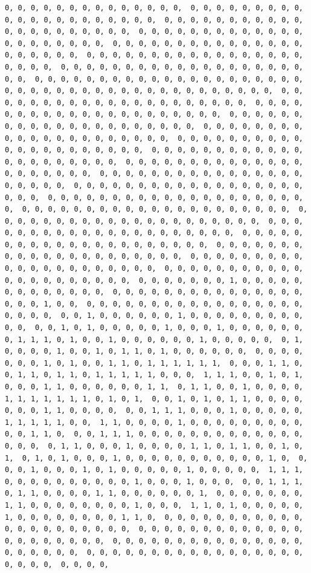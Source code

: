 \documentclass[
]{article}
\begin{document}
\begin{verbatim}
0, 0, 0, 0, 0, 0, 0, 0, 0, 0, 0, 0, 0, 0,  0, 0, 0, 0, 0, 0, 0, 0, 0, 0, 0, 0, 0, 0, 0, 0, 0, 0, 0, 0, 0,  0, 0, 0, 0, 0, 0, 0, 0, 0, 0, 0, 0, 0, 0, 0, 0, 0, 0, 0, 0, 0,  0, 0, 0, 0, 0, 0, 0, 0, 0, 0, 0, 0, 0, 0, 0, 0, 0, 0, 0, 0, 0,  0, 0, 0, 0, 0, 0, 0, 0, 0, 0, 0, 0, 0, 0, 0, 0, 0, 0, 0, 0, 0,  0, 0, 0, 0, 0, 0, 0, 0, 0, 0, 0, 0, 0, 0, 0, 0, 0, 0, 0, 0, 0,  0, 0, 0, 0, 0, 0, 0, 0, 0, 0, 0, 0, 0, 0, 0, 0, 0, 0, 0, 0, 0,  0, 0, 0, 0, 0, 0, 0, 0, 0, 0, 0, 0, 0, 0, 0, 0, 0, 0, 0, 0, 0,  0, 0, 0, 0, 0, 0, 0, 0, 0, 0, 0, 0, 0, 0, 0, 0, 0, 0, 0, 0, 0,  0, 0, 0, 0, 0, 0, 0, 0, 0, 0, 0, 0, 0, 0, 0, 0, 0, 0, 0, 0, 0,  0, 0, 0, 0, 0, 0, 0, 0, 0, 0, 0, 0, 0, 0, 0, 0, 0, 0, 0, 0, 0,  0, 0, 0, 0, 0, 0, 0, 0, 0, 0, 0, 0, 0, 0, 0, 0, 0, 0, 0, 0, 0,  0, 0, 0, 0, 0, 0, 0, 0, 0, 0, 0, 0, 0, 0, 0, 0, 0, 0, 0, 0, 0,  0, 0, 0, 0, 0, 0, 0, 0, 0, 0, 0, 0, 0, 0, 0, 0, 0, 0, 0, 0, 0,  0, 0, 0, 0, 0, 0, 0, 0, 0, 0, 0, 0, 0, 0, 0, 0, 0, 0, 0, 0, 0,  0, 0, 0, 0, 0, 0, 0, 0, 0, 0, 0, 0, 0, 0, 0, 0, 0, 0, 0, 0, 0,  0, 0, 0, 0, 0, 0, 0, 0, 0, 0, 0, 0, 0, 0, 0, 0, 0, 0, 0, 0, 0,  0, 0, 0, 0, 0, 0, 0, 0, 0, 0, 0, 0, 0, 0, 0, 0, 0, 0, 0, 0, 0,  0, 0, 0, 0, 0, 0, 0, 0, 0, 0, 0, 0, 0, 0, 0, 0, 0, 0, 0, 0, 0,  0, 0, 0, 0, 0, 0, 0, 0, 0, 0, 0, 0, 0, 0, 0, 0, 0, 0, 0, 0, 0,  0, 0, 0, 0, 0, 0, 0, 0, 0, 0, 0, 0, 0, 0, 0, 0, 0, 0, 0, 0, 0,  0, 0, 0, 0, 0, 0, 0, 0, 0, 0, 0, 0, 0, 0, 0, 0, 0, 0, 0, 0, 0,  0, 0, 0, 0, 0, 0, 0, 0, 0, 0, 0, 0, 0, 0, 0, 0, 0, 0, 0, 0, 0,  0, 0, 0, 0, 0, 0, 0, 0, 0, 0, 0, 0, 0, 0, 0, 0, 0, 0, 0, 0, 0,  0, 0, 0, 0, 0, 0, 0, 0, 0, 0, 0, 0, 0, 0, 0, 0, 0, 0, 0, 0, 0,  0, 0, 0, 0, 0, 0, 0, 0, 0, 0, 0, 0, 0, 0, 0, 0, 0, 0, 0, 0, 0,  0, 0, 0, 0, 0, 0, 0, 1, 0, 0, 0, 0, 0, 0, 0, 0, 0, 0, 0, 0, 0,  0, 0, 0, 0, 0, 0, 0, 0, 0, 0, 0, 0, 0, 0, 0, 0, 0, 0, 1, 0, 0,  0, 0, 0, 0, 0, 0, 0, 0, 0, 0, 0, 0, 0, 0, 0, 0, 0, 0, 0, 0, 0,  0, 0, 1, 0, 0, 0, 0, 0, 0, 1, 0, 0, 0, 0, 0, 0, 0, 0, 0, 0, 0,  0, 0, 1, 0, 1, 0, 0, 0, 0, 0, 1, 0, 0, 0, 1, 0, 0, 0, 0, 0, 0,  0, 1, 1, 1, 0, 1, 0, 0, 1, 0, 0, 0, 0, 0, 0, 1, 0, 0, 0, 0, 0,  0, 1, 0, 0, 0, 0, 1, 0, 0, 1, 0, 1, 1, 0, 1, 0, 0, 0, 0, 0, 0,  0, 0, 0, 0, 0, 0, 0, 1, 0, 1, 0, 0, 1, 1, 0, 1, 1, 1, 1, 1, 1,  0, 0, 0, 1, 1, 0, 0, 1, 1, 0, 1, 1, 0, 1, 1, 1, 1, 1, 0, 0, 0,  1, 1, 1, 0, 0, 1, 0, 1, 0, 0, 0, 1, 1, 0, 0, 0, 0, 0, 0, 1, 1,  0, 1, 1, 0, 0, 1, 0, 0, 0, 0, 1, 1, 1, 1, 1, 1, 1, 0, 1, 0, 1,  0, 0, 1, 0, 1, 0, 1, 1, 0, 0, 0, 0, 0, 0, 0, 1, 1, 0, 0, 0, 0,  0, 0, 1, 1, 1, 0, 0, 0, 1, 0, 0, 0, 0, 0, 1, 1, 1, 1, 1, 0, 0,  1, 1, 0, 0, 0, 0, 1, 0, 0, 0, 0, 0, 0, 0, 0, 0, 0, 0, 1, 1, 0,  0, 0, 1, 1, 1, 0, 0, 0, 0, 0, 0, 0, 0, 0, 0, 0, 0, 0, 0, 0, 0,  0, 1, 1, 0, 0, 0, 1, 0, 0, 0, 0, 1, 1, 0, 1, 1, 0, 0, 1, 0, 1,  0, 1, 0, 1, 0, 0, 0, 1, 0, 0, 0, 0, 0, 0, 0, 0, 0, 0, 0, 1, 0,  0, 0, 0, 1, 0, 0, 0, 1, 0, 1, 0, 0, 0, 0, 0, 1, 0, 0, 0, 0, 0,  1, 1, 1, 0, 0, 0, 0, 0, 0, 0, 0, 0, 0, 1, 0, 0, 0, 1, 0, 0, 0,  0, 0, 1, 1, 1, 0, 1, 1, 0, 0, 0, 0, 1, 1, 0, 0, 0, 0, 0, 0, 1,  0, 0, 0, 0, 0, 0, 0, 1, 1, 0, 0, 0, 0, 0, 0, 0, 0, 1, 0, 0, 0,  1, 1, 0, 1, 0, 0, 0, 0, 0, 1, 0, 0, 0, 0, 0, 0, 0, 0, 1, 1, 0,  0, 0, 0, 0, 0, 0, 0, 0, 0, 0, 0, 0, 0, 0, 0, 0, 0, 0, 0, 0, 0,  0, 0, 0, 0, 0, 0, 0, 0, 0, 0, 0, 0, 0, 0, 0, 0, 0, 0, 0, 0, 0,  0, 0, 0, 0, 0, 0, 0, 0, 0, 0, 0, 0, 0, 0, 0, 0, 0, 0, 0, 0, 0,  0, 0, 0, 0, 0, 0, 0, 0, 0, 0, 0, 0, 0, 0, 0, 0, 0, 0, 0, 0, 0,  0, 0, 0, 0, 
\end{verbatim}
\end{document}
